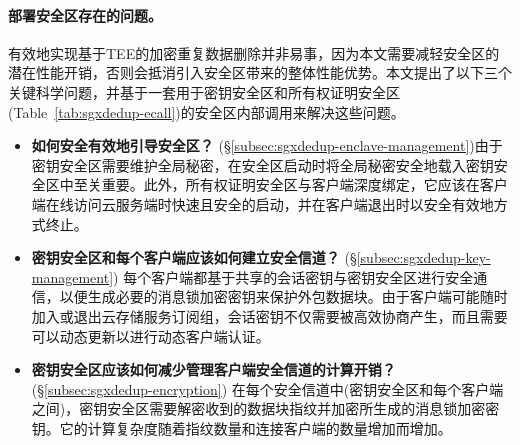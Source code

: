 \paragraph*{部署安全区存在的问题。}有效地实现基于TEE的加密重复数据删除并非易事，因为本文需要减轻安全区的潜在性能开销，否则会抵消引入安全区带来的整体性能优势。本文提出了以下三个关键科学问题，并基于一套用于密钥安全区和所有权证明安全区(Table~\ref{tab:sgxdedup-ecall})的安全区内部调用来解决这些问题。

\begin{itemize}[leftmargin=0em]
    \item \textbf{如何安全有效地引导安全区？} (\S\ref{subsec:sgxdedup-enclave-management})由于密钥安全区需要维护全局秘密，在安全区启动时将全局秘密安全地载入密钥安全区中至关重要。此外，所有权证明安全区与客户端深度绑定，它应该在客户端在线访问云服务端时快速且安全的启动，并在客户端退出时以安全有效地方式终止。
    \item \textbf{密钥安全区和每个客户端应该如何建立安全信道？} (\S\ref{subsec:sgxdedup-key-management})
          每个客户端都基于共享的会话密钥与密钥安全区进行安全通信，以便生成必要的消息锁加密密钥来保护外包数据块。由于客户端可能随时加入或退出云存储服务订阅组，会话密钥不仅需要被高效协商产生，而且需要可以动态更新以进行动态客户端认证。
    \item \textbf{密钥安全区应该如何减少管理客户端安全信道的计算开销？} (\S\ref{subsec:sgxdedup-encryption})
          在每个安全信道中(密钥安全区和每个客户端之间)，密钥安全区需要解密收到的数据块指纹并加密所生成的消息锁加密密钥。它的计算复杂度随着指纹数量和连接客户端的数量增加而增加。
\end{itemize}
